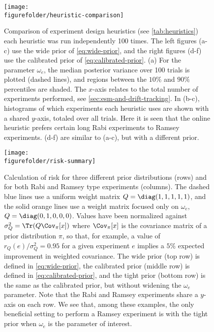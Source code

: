 \documentclass[aps,nofootinbib,twocolumn,superscriptaddress]{revtex4}
\newcommand{\figurefolder}{../fig}
\newcommand{\mps}{x}
\newcommand{\eps}{e}
\begin{document}
\begin{figure*}
    \centering
    \texttt{[image: \\figurefolder/heuristic-comparison]}
    \caption{Comparison of experiment design heuristics 
    (see \autoref{tab:heuristics}) each heuristic was run
    independently 100 times.
    The left figures (a-c) use the wide prior of \autoref{eq:wide-prior}, 
    and the right figures (d-f) use the calibrated prior of 
    \autoref{eq:calibrated-prior}.
    (a) For the parameter $\omega_e$, the median posterior variance 
    over 100 trials is plotted (dashed lines), and 
    regions between the $10\%$ and $90\%$ percentiles are shaded.
    The $x$-axis relates to the total number of experiments performed,
    see \autoref{sec:esm-and-drift-tracking}.
    In (b-c), histograms of which experiments each heuristic uses are 
    shown with a shared $y$-axis, totaled over all trials.
    Here it is seen that the online heuristic prefers certain long Rabi
    experiments to Ramsey experiments.
    (d-f) are similar to (a-c), but with a different prior.
    }
    \label{fig:heuristic-comparison}
\end{figure*}

\begin{figure}
    \texttt{[image: \\figurefolder/risk-summary]}
    \caption{Calculation of risk for three different prior distributions (rows)
        and for both Rabi and Ramsey type experiments (columns).
        The dashed blue lines use a uniform weight matrix $Q=\diag(1,1,1,1,1)$,
        and the solid orange lines use a weight matrix focused only on $\omega_e$,
        $Q=\diag(0,1,0,0,0)$.
        Values have been normalized against $\sigma_Q^2=\Tr(Q\Cov_{\pi}[\mps])$
        where $\Cov_{\pi}[\mps]$ is the covariance matrix of a prior 
        distribution $\pi$, 
        so that, for example, a value of $r_Q(\eps)/\sigma_Q^2=0.95$ for a given 
        experiment $\eps$
        implies a $5\%$ expected improvement in weighted covariance.
        The wide prior (top row) is defined in \autoref{eq:wide-prior}, the
        calibrated prior (middle row) is defined in \autoref{eq:calibrated-prior}, 
        and the tight prior (bottom row) is the same as the calibrated prior, but 
        without widening the $\omega_e$ parameter.
        Note that the Rabi and Ramsey experiments share a $y$-axis on each row.
        We see that, among these examples, the only beneficial setting to 
        perform a Ramsey experiment is with the tight prior when $\omega_e$ 
        is the parameter of interest.
        }
    \label{fig:risk-summary}
\end{figure}
\end{document}
